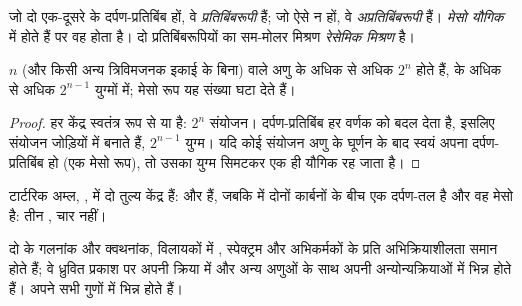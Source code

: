 \begin{definition}[प्रतिबिंबरूपी, अप्रतिबिंबरूपी, मेसो यौगिक, रेसेमिक मिश्रण]\label{def:b1:stereochemistry-in-depth:enantiomers}
जो दो  एक-दूसरे के दर्पण-प्रतिबिंब हों, वे
\emph{प्रतिबिंबरूपी} हैं; जो  ऐसे न हों, वे
\emph{अप्रतिबिंबरूपी} हैं। \emph{मेसो
यौगिक} में  होते हैं पर वह  होता है।
दो प्रतिबिंबरूपियों का सम-मोलर मिश्रण \emph{रेसेमिक
मिश्रण} है।
\end{definition}

\begin{proposition}[त्रिविम समावयवियों की संख्या]\label{prop:b1:stereochemistry-in-depth:max-stereoisomers}
$n$  (और किसी अन्य त्रिविमजनक इकाई के बिना) वाले अणु के
अधिक से अधिक $2^n$  होते हैं,  के अधिक से अधिक
$2^{n-1}$ युग्मों में; मेसो रूप यह संख्या घटा देते हैं।
\end{proposition}

\begin{proof}
हर केंद्र स्वतंत्र रूप से  या  है: $2^n$ संयोजन।
दर्पण-प्रतिबिंब हर वर्णक को बदल देता है, इसलिए संयोजन जोड़ियों में
 बनाते हैं, $2^{n-1}$ युग्म। यदि कोई संयोजन अणु के घूर्णन के बाद
स्वयं अपना दर्पण-प्रतिबिंब हो (एक मेसो रूप), तो उसका युग्म सिमटकर
एक ही यौगिक रह जाता है।
\end{proof}

टार्टरिक अम्ल, , में दो तुल्य केंद्र हैं:
 और   हैं, जबकि  में दोनों कार्बनों के बीच
एक दर्पण-तल है और वह मेसो है: तीन , चार नहीं।

\begin{proposition}[प्रतिबिंबरूपियों के गुण]\label{prop:b1:stereochemistry-in-depth:enantiomer-properties}
दो  के गलनांक और क्वथनांक,  विलायकों में ,
स्पेक्ट्रम और  अभिकर्मकों के प्रति अभिक्रियाशीलता समान होते हैं;
वे ध्रुवित प्रकाश पर अपनी क्रिया में और अन्य  अणुओं के साथ अपनी
अन्योन्यक्रियाओं में भिन्न होते हैं।  अपने सभी गुणों में
भिन्न होते हैं।
\end{proposition}

